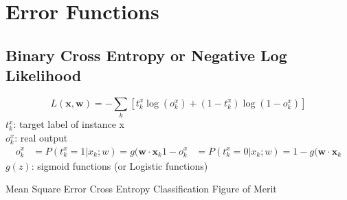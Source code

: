 \section{Error Functions}
\label{sect:error-functions}

\subsection{Binary Cross Entropy or Negative Log Likelihood}
\label{ssect:binary-cross-entropy}
\[
L(\mathbf{x}, \mathbf{w}) = - \sum_k [t_k^x \log(o_k^x) + (1-t_k^x) \log(1-o_k^x)]
\]
$t_k^x$: target label of instance x \\
$o_k^x$: real output
\begin{align*}
o_k^x &= P(t_k^x = 1|x_k; w) = g(\mathbf{w} \cdot \mathbf{x}_k
1 - o_k^x &= P(t_k^x = 0|x_k; w) = 1 - g(\mathbf{w} \cdot \mathbf{x}_k
\end{align*}
$g(z)$: sigmoid functions (or Logistic functions)




Mean Square Error
Cross Entropy
Classification Figure of Merit

\newpage